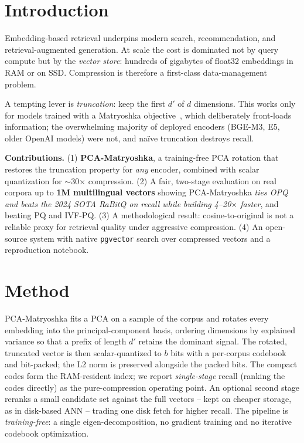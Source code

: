 \documentclass[sigconf, nonacm]{acmart}
\begin{document}
\section{Introduction}
Embedding-based retrieval underpins modern search, recommendation, and
retrieval-augmented generation. At scale the cost is dominated not by query
compute but by the \emph{vector store}: hundreds of gigabytes of float32
embeddings in RAM or on SSD. Compression is therefore a first-class
data-management problem.

A tempting lever is \emph{truncation}: keep the first $d'$ of $d$ dimensions.
This works only for models trained with a Matryoshka objective~\cite{mrl}, which
deliberately front-loads information; the overwhelming majority of deployed
encoders (BGE-M3, E5, older OpenAI models) were not, and na\"ive truncation
destroys recall.

\textbf{Contributions.} (1) \textbf{PCA-Matryoshka}, a training-free PCA rotation
that restores the truncation property for \emph{any} encoder, combined with
scalar quantization for $\sim$30$\times$ compression. (2) A fair, two-stage
evaluation on real corpora up to \textbf{1M multilingual vectors} showing
PCA-Matryoshka \emph{ties OPQ and beats the 2024 SOTA RaBitQ on recall while
building 4--20$\times$ faster}, and beating PQ and IVF-PQ. (3) A methodological
result: cosine-to-original is not a reliable proxy for retrieval quality under
aggressive compression. (4) An open-source system with native
\texttt{pgvector} search over compressed vectors and a reproduction notebook.

\section{Method}
PCA-Matryoshka fits a PCA on a sample of the corpus and rotates every embedding
into the principal-component basis, ordering dimensions by explained variance so
that a prefix of length $d'$ retains the dominant signal. The rotated, truncated
vector is then scalar-quantized to $b$ bits with a per-corpus codebook and
bit-packed; the L2 norm is preserved alongside the packed bits. The compact codes
form the RAM-resident index; we report \emph{single-stage} recall (ranking the
codes directly) as the pure-compression operating point. An optional second stage
reranks a small candidate set against the full vectors -- kept on cheaper
storage, as in disk-based ANN -- trading one disk fetch for higher recall. The
pipeline is \emph{training-free}: a single eigen-decomposition, no gradient
training and no iterative codebook optimization.
\end{document}

